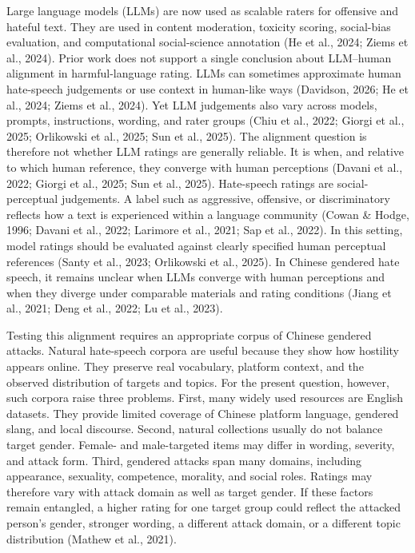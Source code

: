\documentclass[a4paper,fleqn,review]{cas-sc}
\begin{document}
Large language models (LLMs) are now used as scalable raters for offensive and hateful text. They are used in content moderation, toxicity scoring, social-bias evaluation, and computational social-science annotation (He et al., 2024; Ziems et al., 2024). Prior work does not support a single conclusion about LLM--human alignment in harmful-language rating. LLMs can sometimes approximate human hate-speech judgements or use context in human-like ways (Davidson, 2026; He et al., 2024; Ziems et al., 2024). Yet LLM judgements also vary across models, prompts, instructions, wording, and rater groups (Chiu et al., 2022; Giorgi et al., 2025; Orlikowski et al., 2025; Sun et al., 2025). The alignment question is therefore not whether LLM ratings are generally reliable. It is when, and relative to which human reference, they converge with human perceptions (Davani et al., 2022; Giorgi et al., 2025; Sun et al., 2025). Hate-speech ratings are social-perceptual judgements. A label such as aggressive, offensive, or discriminatory reflects how a text is experienced within a language community (Cowan \& Hodge, 1996; Davani et al., 2022; Larimore et al., 2021; Sap et al., 2022). In this setting, model ratings should be evaluated against clearly specified human perceptual references (Santy et al., 2023; Orlikowski et al., 2025). In Chinese gendered hate speech, it remains unclear when LLMs converge with human perceptions and when they diverge under comparable materials and rating conditions (Jiang et al., 2021; Deng et al., 2022; Lu et al., 2023).

Testing this alignment requires an appropriate corpus of Chinese gendered attacks. Natural hate-speech corpora are useful because they show how hostility appears online. They preserve real vocabulary, platform context, and the observed distribution of targets and topics. For the present question, however, such corpora raise three problems. First, many widely used resources are English datasets. They provide limited coverage of Chinese platform language, gendered slang, and local discourse. Second, natural collections usually do not balance target gender. Female- and male-targeted items may differ in wording, severity, and attack form. Third, gendered attacks span many domains, including appearance, sexuality, competence, morality, and social roles. Ratings may therefore vary with attack domain as well as target gender. If these factors remain entangled, a higher rating for one target group could reflect the attacked person's gender, stronger wording, a different attack domain, or a different topic distribution (Mathew et al., 2021).
\end{document}
